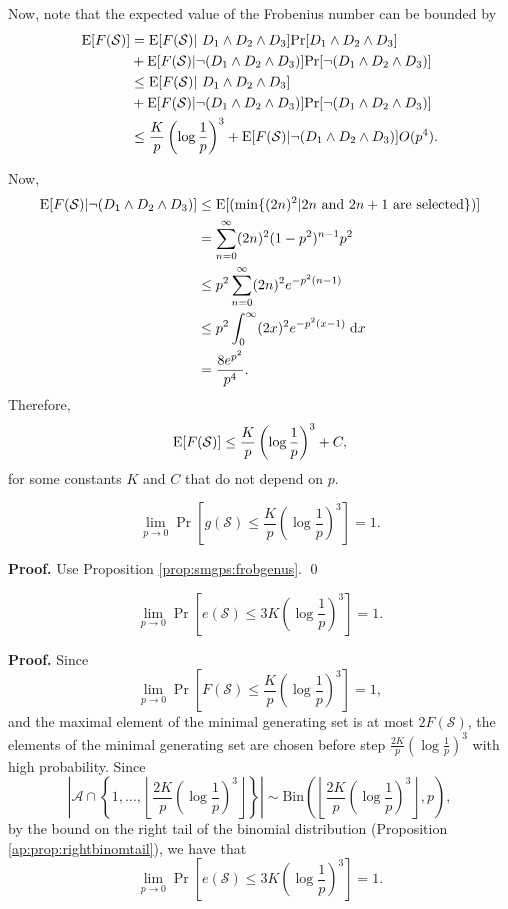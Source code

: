 Now, note that the expected value of the Frobenius number can be bounded by
\begin{align*}
\EE[F(\mathcal{S})] &= \EE[F(\mathcal{S}) | D_1 \land D_2 \land D_3] \Pr[D_1 \land D_2 \land D_3]
\\&+ \EE[F(\mathcal{S}) |\lnot(D_1 \land D_2 \land D_3)] \Pr[\lnot(D_1 \land D_2 \land D_3)] 
\\&\leq \EE[F(\mathcal{S}) | D_1 \land D_2 \land D_3] 
\\&+ \EE[F(\mathcal{S}) |\lnot(D_1 \land D_2 \land D_3)] \Pr[\lnot(D_1 \land D_2 \land D_3)]
\\&\leq \frac{K}{p}\left(\log \frac{1}{p}\right)^3 + \EE[F(\mathcal{S}) |\lnot(D_1 \land D_2 \land D_3)]O(p^4).
\end{align*}

Now,
\begin{align*}
    \mathrm{E}[F(\mathcal{S}) |\lnot(D_1 \land D_2 \land D_3)] &\leq \mathrm{E}[(\min\{(2n)^2|2n \text{ and } 2n + 1 \text{ are selected} \})]
    \\&= \sum_{n = 0}^\infty (2n)^2 (1 - p^2)^{n - 1}p^2
    \\&\leq p^2\sum_{n = 0}^\infty (2n)^2 e^{-p^2(n - 1)}
    \\&\leq p^2 \int_{0}^\infty (2x)^2 e^{-p^2(x - 1)}\;\mathrm{d}x
    \\&= \frac{8e^{p^2}}{p^4}.
\end{align*}
Therefore, 
\[\mathrm{E}[F(\mathcal{S})] \leq \frac{K}{p}\left(\log \frac{1}{p}\right)^3 + C,\]
for some constants $K$ and $C$ that do not depend on $p$.
\begin{corollary}
    \[\lim_{p \to 0}\Pr\left[g(\mathcal{S}) \leq \frac{K}{p}\left(\log \frac{1}{p}\right)^3\right] = 1.\]
\end{corollary}
\textbf{Proof. } Use Proposition \ref{prop:smgps:frobgenus}. \qed
\begin{corollary}
    \[\lim_{p \to 0}\Pr\left[e(\mathcal{S}) \leq 3K\left(\log \frac{1}{p}\right)^3\right] = 1.\]
\end{corollary}
\textbf{Proof. } Since
\[\lim_{p \to 0}\Pr\left[F(\mathcal{S}) \leq \frac{K}{p}\left(\log \frac{1}{p}\right)^3\right] = 1,\]
and the maximal element of the minimal generating set is at most $2F(\mathcal{S})$, the elements of the minimal generating set are chosen before step $\frac{2K}{p}\left(\log \frac{1}{p}\right)^3$ with high probability. Since 
\[\left|\mathcal{A}\cap\left\{1, \ldots, \left\lfloor\frac{2K}{p}\left(\log \frac{1}{p}\right)^3\right \rfloor\right\}\right| \sim \mathrm{Bin}\left(\left\lfloor\frac{2K}{p}\left(\log \frac{1}{p}\right)^3\right \rfloor, p\right),\]
 by the bound on the right tail of the binomial distribution (Proposition \ref{ap:prop:rightbinomtail}), we have that
\[\lim_{p \to 0}\Pr\left[e(\mathcal{S}) \leq 3K\left(\log \frac{1}{p}\right)^3\right] = 1.\]
